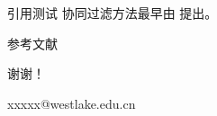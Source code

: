 \documentclass[11pt]{beamer}
\makeatletter
\newcommand{\email}{xxxxx@westlake.edu.cn}
\makeatother
\begin{document}

\begin{frame}{引用测试}
  协同过滤方法最早由 \cite{hu2008collaborative}提出。
\end{frame}



    
% 
% 

\begin{frame}[allowframebreaks]{参考文献}
  
  
\end{frame}


\begin{frame}
\begin{center}
 谢谢！

 \email
\end{center}
\end{frame}

\end{document}
